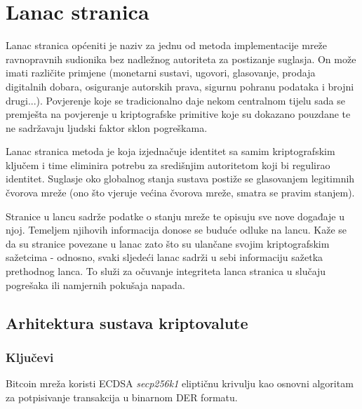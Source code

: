\documentclass[utf8, zavrsni]{fer}
\begin{document}
\chapter{Lanac stranica}
Lanac stranica općeniti je naziv za jednu od metoda implementacije mreže ravnopravnih sudionika bez nadležnog autoriteta za postizanje suglasja. On može imati različite primjene (monetarni sustavi, ugovori, glasovanje, prodaja digitalnih dobara, osiguranje autorskih prava, sigurnu pohranu podataka i brojni drugi...). Povjerenje koje se tradicionalno daje nekom centralnom tijelu sada se premješta na povjerenje u kriptografske primitive koje su dokazano pouzdane te ne sadržavaju ljudski faktor sklon pogreškama.

Lanac stranica metoda je koja izjednačuje identitet sa samim kriptografskim ključem i time eliminira potrebu za središnjim autoritetom koji bi regulirao identitet. Suglasje oko globalnog stanja sustava postiže se glasovanjem legitimnih \footnotemark čvorova mreže (ono što vjeruje većina čvorova mreže, smatra se pravim stanjem).

Stranice u lancu sadrže podatke o stanju mreže te opisuju sve nove događaje u njoj. Temeljem njihovih informacija donose se buduće odluke na lancu. Kaže se da su stranice povezane u lanac zato što su ulančane svojim kriptografskim sažetcima - odnosno, svaki sljedeći lanac sadrži u sebi informaciju sažetka prethodnog lanca. To služi za očuvanje integriteta lanca stranica u slučaju pogrešaka ili namjernih pokušaja napada.


\section{Arhitektura sustava kriptovalute}
\subsection{Ključevi}
Bitcoin mreža koristi ECDSA \textit{secp256k1} eliptičnu krivulju kao osnovni algoritam za potpisivanje transakcija u binarnom DER formatu.
\end{document}
